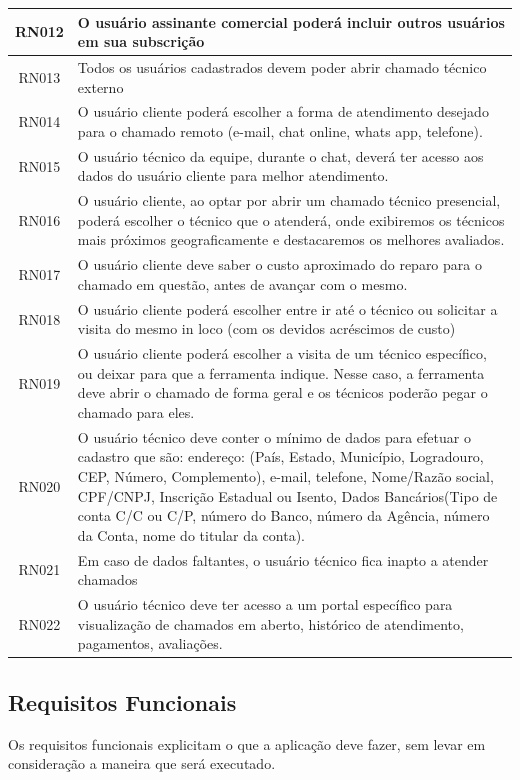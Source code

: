 \documentclass[
    12pt,               %
    openright,          %
    oneside,
    a4paper,            %
    MODELO,             %
    english,            %
    brazil              %
   ]{ifsp-spo-inf-ctds}
\begin{document}
\begin{center}
\begin{longtable}{|c|p{14cm}|}
RN012 & O usuário assinante comercial poderá incluir outros usuários em sua subscrição \\ \hline
RN013 & Todos os usuários cadastrados devem poder abrir chamado técnico externo \\ \hline
RN014 & O usuário cliente poderá escolher a forma de atendimento desejado para o chamado remoto (e-mail, chat online, whats app, telefone). \\ \hline
RN015 & O usuário técnico da equipe, durante o chat, deverá ter acesso aos dados do usuário cliente para melhor atendimento. \\ \hline
RN016 & O usuário cliente, ao optar por abrir um chamado técnico presencial, poderá escolher o técnico que o atenderá, onde exibiremos os técnicos mais próximos geograficamente e destacaremos os melhores avaliados. \\ \hline
RN017 & O usuário cliente deve saber o custo aproximado do reparo para o chamado em questão, antes de avançar com o mesmo. \\ \hline
RN018 & O usuário cliente poderá escolher entre ir até o técnico ou solicitar a visita do mesmo in loco (com os devidos acréscimos de custo) \\ \hline
RN019 & O usuário cliente poderá escolher a visita de um técnico específico, ou deixar para que a ferramenta indique. Nesse caso, a ferramenta deve abrir o chamado de forma geral e os técnicos poderão pegar o chamado para eles. \\ \hline
RN020 & O usuário técnico deve conter o mínimo de dados para efetuar o cadastro que são: endereço: (País, Estado, Município, Logradouro, CEP, Número, Complemento), e-mail, telefone, Nome/Razão social, CPF/CNPJ, Inscrição Estadual ou Isento, Dados Bancários(Tipo de conta C/C ou C/P, número do Banco, número da Agência, número da Conta, nome do titular da conta). \\ \hline
RN021 & Em caso de dados faltantes, o usuário técnico fica inapto a atender chamados \\ \hline
RN022 & O usuário técnico deve ter acesso a um portal específico para visualização de chamados em aberto, histórico de atendimento, pagamentos, avaliações. \\ \hline
\end{longtable}
\end{center}

\subsection{Requisitos Funcionais}
Os requisitos funcionais explicitam o que a aplicação deve fazer, sem levar em consideração a maneira que será executado.
\end{document}
